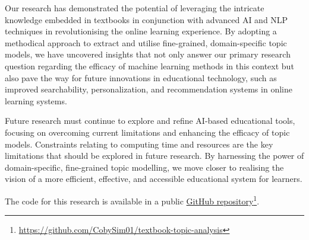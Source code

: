 \documentclass[twocolumn]{article}
\begin{document}
Our research has demonstrated the potential of leveraging the intricate knowledge embedded in textbooks in conjunction with advanced AI and NLP techniques in revolutionising the online learning experience. By adopting a methodical approach to extract and utilise fine-grained, domain-specific topic models, we have uncovered insights that not only answer our primary research question regarding the efficacy of machine learning methods in this context but also pave the way for future innovations in educational technology, such as improved searchability, personalization, and recommendation systems in online learning systems.

Future research must continue to explore and refine AI-based educational tools, focusing on overcoming current limitations and enhancing the efficacy of topic models. Constraints relating to computing time and resources are the key limitations that should be explored in future research. By harnessing the power of domain-specific, fine-grained topic modelling, we move closer to realising the vision of a more efficient, effective, and accessible educational system for learners.

The code for this research is available in a public \href{https://github.com/CobySim01/textbook-topic-analysis}{GitHub repository}\footnote{\url{https://github.com/CobySim01/textbook-topic-analysis}}.


\small\printbibliography
\end{document}
